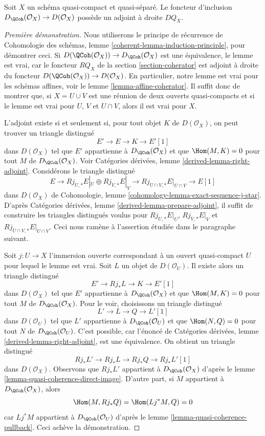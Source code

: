 \begin{lemma}
\label{lemma-better-coherator}
Soit $X$ un schéma quasi-compact et quasi-séparé.
Le foncteur d'inclusion $D_\QCoh(\mathcal{O}_X) \to D(\mathcal{O}_X)$
possède un adjoint à droite $DQ_X$.
\end{lemma}

\begin{proof}[Première démonstration]
Nous utiliserons le principe de récurrence de
Cohomologie des schémas, lemme \ref{coherent-lemma-induction-principle},
pour démontrer ceci. Si $D(\QCoh(\mathcal{O}_X)) \to D_\QCoh(\mathcal{O}_X)$
est une équivalence, le lemme est vrai, car le foncteur
$RQ_X$ de la section \ref{section-coherator} est adjoint à droite du foncteur
$D(\QCoh(\mathcal{O}_X)) \to D(\mathcal{O}_X)$.
En particulier, notre lemme est vrai pour les schémas affines, voir le
lemme \ref{lemma-affine-coherator}.
Il suffit donc de montrer que, si $X = U \cup V$
est une réunion de deux ouverts quasi-compacts et si le
lemme est vrai pour $U$, $V$ et $U \cap V$, alors il est vrai pour $X$.

\medskip\noindent
L'adjoint existe si et seulement si, pour tout objet $K$ de
$D(\mathcal{O}_X)$, on peut trouver un triangle distingué
$$
E' \to E \to K \to E'[1]
$$
dans $D(\mathcal{O}_X)$
tel que $E'$ appartienne à $D_\QCoh(\mathcal{O}_X)$ et que
$\Hom(M, K) = 0$ pour tout $M$ de $D_\QCoh(\mathcal{O}_X)$. Voir
Catégories dérivées, lemme \ref{derived-lemma-right-adjoint}.
Considérons le triangle distingué
$$
E \to Rj_{U, *}E|_U \oplus Rj_{V, *}E|_V \to
Rj_{U \cap V, *}E|_{U \cap V} \to E[1]
$$
dans $D(\mathcal{O}_X)$ de
Cohomologie, lemme \ref{cohomology-lemma-exact-sequence-j-star}.
D'après Catégories dérivées, lemme \ref{derived-lemma-prepare-adjoint},
il suffit de construire les triangles distingués voulus
pour $Rj_{U, *}E|_U$, $Rj_{V, *}E|_V$ et
$Rj_{U \cap V, *}E|_{U \cap V}$. Ceci nous ramène à l'assertion
étudiée dans le paragraphe suivant.

\medskip\noindent
Soit $j : U \to X$ l'immersion ouverte correspondant à un ouvert quasi-compact $U$
pour lequel le lemme est vrai. Soit $L$ un objet de $D(\mathcal{O}_U)$.
Il existe alors un triangle distingué
$$
E' \to Rj_*L \to K \to E'[1]
$$
dans $D(\mathcal{O}_X)$
tel que $E'$ appartienne à $D_\QCoh(\mathcal{O}_X)$ et que
$\Hom(M, K) = 0$ pour tout $M$ de $D_\QCoh(\mathcal{O}_X)$.
Pour le voir, choisissons un triangle distingué
$$
L' \to L \to Q \to L'[1]
$$
dans $D(\mathcal{O}_U)$ tel que $L'$ appartienne à $D_\QCoh(\mathcal{O}_U)$
et que $\Hom(N, Q) = 0$ pour tout $N$ de $D_\QCoh(\mathcal{O}_U)$.
C'est possible, car l'énoncé de
Catégories dérivées, lemme \ref{derived-lemma-right-adjoint},
est une équivalence.
On obtient un triangle distingué
$$
Rj_*L' \to Rj_*L \to Rj_*Q \to Rj_*L'[1]
$$
dans $D(\mathcal{O}_X)$. Observons que $Rj_*L'$ appartient à $D_\QCoh(\mathcal{O}_X)$
d'après le lemme \ref{lemma-quasi-coherence-direct-image}.
D'autre part, si $M$ appartient à $D_\QCoh(\mathcal{O}_X)$, alors
$$
\Hom(M, Rj_*Q) = \Hom(Lj^*M, Q) = 0
$$
car $Lj^*M$ appartient à $D_\QCoh(\mathcal{O}_U)$ d'après le
lemme \ref{lemma-quasi-coherence-pullback}.
Ceci achève la démonstration.
\end{proof}

